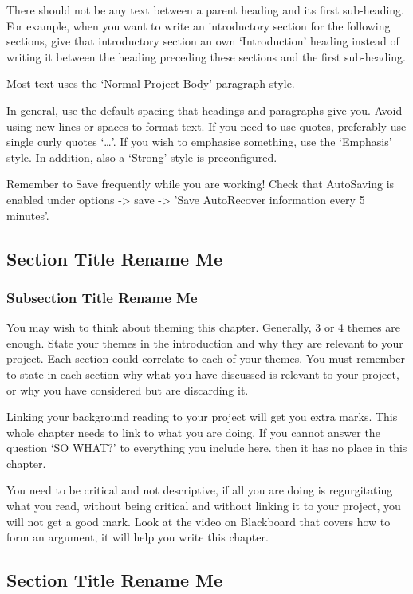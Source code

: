 \documentclass[a4paper,11pt]{bgwork}
\begin{document}
There should not be any text between a parent heading and its first sub-heading. For example, when you want to write an introductory section for the following sections, give that introductory section an own ‘Introduction’ heading instead of writing it between the heading preceding these sections and the first sub-heading.

Most text uses the ‘Normal Project Body’ paragraph style.

In general, use the default spacing that headings and paragraphs give you. Avoid using new-lines or spaces to format text. If you need to use quotes, preferably use single curly quotes ‘…’. If you wish to emphasise something, use the ‘Emphasis’ style. In addition, also a ‘Strong’ style is preconfigured.

Remember to Save frequently while you are working! Check that AutoSaving is enabled under options -> save -> 'Save AutoRecover information every 5 minutes'.

\subsection{Section Title Rename Me}
\subsubsection{Subsection Title Rename Me}
You may wish to think about theming this chapter. Generally, 3 or 4 themes are enough. State your themes in the introduction and why they are relevant to your project. Each section could correlate to each of your themes. You must remember to state in each section why what you have discussed is relevant to your project, or why you have considered but are discarding it.

Linking your background reading to your project will get you extra marks. This whole chapter needs to link to what you are doing. If you cannot answer the question ‘SO WHAT?’ to everything you include here. then it has no place in this chapter.

You need to be critical and not descriptive, if all you are doing is regurgitating what you read, without being critical and without linking it to your project, you will not get a good mark. Look at the video on Blackboard that covers how to form an argument, it will help you write this chapter.

\subsection{Section Title Rename Me}
\end{document}
